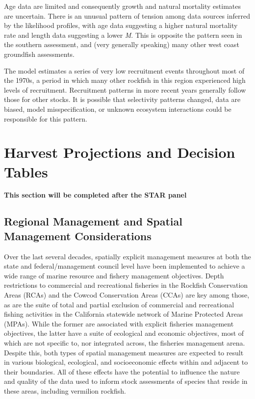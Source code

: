 \documentclass[
  english,
  a4paper,
]{article}
\begin{document}
Age data are limited and consequently growth and natural mortality estimates are uncertain. There is an unusual pattern of tension among data sources inferred by the likelihood profiles, with age data suggesting a higher natural mortality rate and length data suggesting a lower \emph{M}. This is opposite the pattern seen in the southern assessment, and (very generally speaking) many other west coast groundfish assessments.

The model estimates a series of very low recruitment events throughout most of the 1970s, a period in which many other rockfish in this region experienced high levels of recruitment. Recruitment patterns in more recent years generally follow those for other stocks. It is possible that selectivity patterns changed, data are biased, model misspecification, or unknown ecosystem interactions could be responsible for this pattern.

\hypertarget{harvest-projections-and-decision-tables}{%
\section{Harvest Projections and Decision Tables}\label{harvest-projections-and-decision-tables}}

\textbf{This section will be completed after the STAR panel}

\hypertarget{regional-management-and-spatial-management-considerations}{%
\subsection{Regional Management and Spatial Management Considerations}\label{regional-management-and-spatial-management-considerations}}

Over the last several decades, spatially explicit management measures at both the state and federal/management council level have been implemented to achieve a wide range of marine resource and fishery management objectives. Depth restrictions to commercial and recreational fisheries in the Rockfish Conservation Areas (RCAs) and the Cowcod Conservation Areas (CCAs) are key among those, as are the suite of total and partial exclusion of commercial and recreational fishing activities in the California statewide network of Marine Protected Areas (MPAs). While the former are associated with explicit fisheries management objectives, the latter have a suite of ecological and economic objectives, most of which are not specific to, nor integrated across, the fisheries management arena. Despite this, both types of spatial management measures are expected to result in various biological, ecological, and socioeconomic effects within and adjacent to their boundaries. All of these effects have the potential to influence the nature and quality of the data used to inform stock assessments of species that reside in these areas, including vermilion rockfish.
\end{document}
